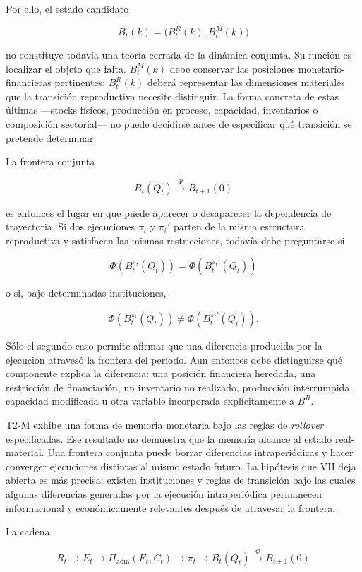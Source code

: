\documentclass[10pt,a5paper,twoside]{article}
\begin{document}
Por ello, el estado candidato

\[
B_t(k)=\bigl(B_t^R(k),B_t^M(k)\bigr)
\]

no constituye todavía una teoría cerrada de la dinámica conjunta. Su función es
localizar el objeto que falta. \(B_t^M(k)\) debe conservar las posiciones
monetario-financieras pertinentes; \(B_t^R(k)\) deberá representar las
dimensiones materiales que la transición reproductiva necesite distinguir. La
forma concreta de estas últimas ---stocks físicos, producción en proceso,
capacidad, inventarios o composición sectorial--- no puede decidirse antes de
especificar qué transición se pretende determinar.

La frontera conjunta

\[
B_t(Q_t)\xrightarrow{\;\Phi\;}B_{t+1}(0)
\]

es entonces el lugar en que puede aparecer o desaparecer la dependencia de
trayectoria. Si dos ejecuciones \(\pi_t\) y \(\pi_t'\) parten de la misma
estructura reproductiva y satisfacen las mismas restricciones, todavía debe
preguntarse si

\[
\Phi\!\left(B_t^{\pi_t}(Q_t)\right)
=
\Phi\!\left(B_t^{\pi_t'}(Q_t)\right)
\]

o si, bajo determinadas instituciones,

\[
\Phi\!\left(B_t^{\pi_t}(Q_t)\right)
\ne
\Phi\!\left(B_t^{\pi_t'}(Q_t)\right).
\]

Sólo el segundo caso permite afirmar que una diferencia producida por la
ejecución atravesó la frontera del período. Aun entonces debe distinguirse qué
componente explica la diferencia: una posición financiera heredada, una
restricción de financiación, un inventario no realizado, producción
interrumpida, capacidad modificada u otra variable incorporada explícitamente a
\(B^R\).

T2-M exhibe una forma de memoria monetaria bajo las reglas de \emph{rollover}
especificadas. Ese resultado no demuestra que la memoria alcance al estado
real-material. Una frontera conjunta puede borrar diferencias intraperiódicas y
hacer converger ejecuciones distintas al mismo estado futuro. La hipótesis que
VII deja abierta es más precisa: existen instituciones y reglas de transición
bajo las cuales algunas diferencias generadas por la ejecución intraperiódica
permanecen informacional y económicamente relevantes después de atravesar la
frontera.

La cadena

\[
R_t
\to E_t
\to \Pi_{\mathrm{adm}}(E_t,C_t)
\to \pi_t
\to B_t(Q_t)
\xrightarrow{\Phi} B_{t+1}(0)
\]
\end{document}

